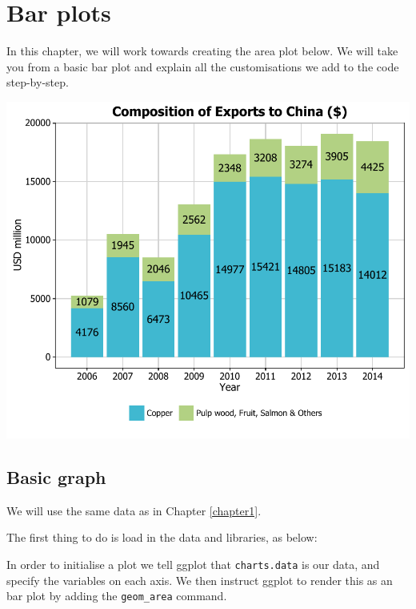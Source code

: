 \chapter{Bar plots}

In this chapter, we will work towards creating the area plot below. We
will take you from a basic bar plot and explain all the customisations
we add to the code step-by-step.

\begin{center}\includegraphics[width=0.6\linewidth]{3_Bar_Plots_pdf/bar_final-1} \end{center}

\section{Basic graph}\label{basic-graph}

We will use the same data as in Chapter \ref{chapter1}.

The first thing to do is load in the data and libraries, as below:

\begin{Shaded}
\begin{Highlighting}[]

\StringTok{ }\NormalTok{(}\NormalTok{)}
\end{Highlighting}
\end{Shaded}

In order to initialise a plot we tell ggplot that \texttt{charts.data}
is our data, and specify the variables on each axis. We then instruct
ggplot to render this as an bar plot by adding the \texttt{geom\_area}
command.

